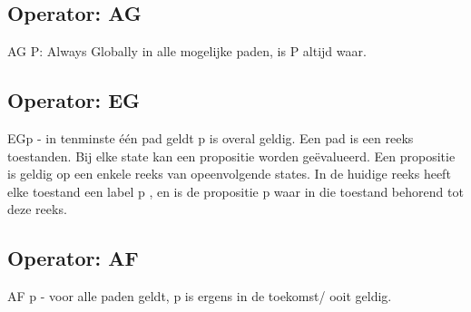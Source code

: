 \documentclass{article}
\begin{document}
	\subsection{Operator: AG}
	
	
	AG P: Always Globally in alle mogelijke paden, is P altijd waar.
	
	
	
	\subsection{Operator: EG}
	EGp - in tenminste één pad geldt p is overal geldig.
	Een pad is een reeks toestanden. Bij elke state kan een propositie  worden geëvalueerd. Een propositie is geldig op een enkele reeks van opeenvolgende states.
	In de huidige reeks heeft elke toestand een label p , en  is de propositie p waar in die toestand behorend tot deze reeks.
	
	
	\subsection{Operator: AF}
	AF p - voor alle paden geldt, p is ergens in de toekomst/ ooit geldig.
	
\end{document}
